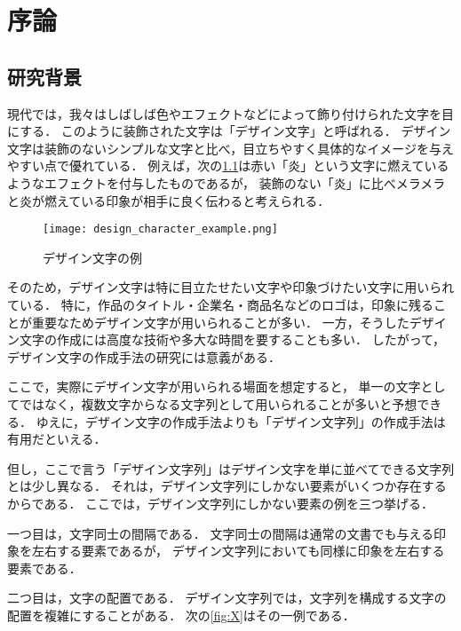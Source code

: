 \documentclass[\homedir/main.tex]{subfiles}
\begin{document}
\setcounter{chapter}{0}
\chapter{序論}\label{chap:introduction}

\section{研究背景}\label{sec:background}
現代では，我々はしばしば色やエフェクトなどによって飾り付けられた文字を目にする．
このように装飾された文字は「デザイン文字」と呼ばれる．
デザイン文字は装飾のないシンプルな文字と比べ，目立ちやすく具体的なイメージを与えやすい点で優れている．
例えば，次の\cref{fig:design_char_eg}は赤い「炎」という文字に燃えているようなエフェクトを付与したものであるが，
装飾のない「炎」に比べメラメラと炎が燃えている印象が相手に良く伝わると考えられる．

\begin{figure}[h]
    \centering
    \texttt{[image: design\_character\_example.png]}
    \caption{デザイン文字の例}
    \label{fig:design_char_eg}
\end{figure}

そのため，デザイン文字は特に目立たせたい文字や印象づけたい文字に用いられている．
特に，作品のタイトル・企業名・商品名などのロゴは，印象に残ることが重要なためデザイン文字が用いられることが多い．
一方，そうしたデザイン文字の作成には高度な技術や多大な時間を要することも多い．
したがって，デザイン文字の作成手法の研究には意義がある．

ここで，実際にデザイン文字が用いられる場面を想定すると，
単一の文字としてではなく，複数文字からなる文字列として用いられることが多いと予想できる．
ゆえに，デザイン文字の作成手法よりも「デザイン文字列」の作成手法は有用だといえる．

但し，ここで言う「デザイン文字列」はデザイン文字を単に並べてできる文字列とは少し異なる．
それは，デザイン文字列にしかない要素がいくつか存在するからである．
ここでは，デザイン文字列にしかない要素の例を三つ挙げる．

一つ目は，文字同士の間隔である．
文字同士の間隔は通常の文書でも与える印象を左右する要素であるが，
デザイン文字列においても同様に印象を左右する要素である．

二つ目は，文字の配置である．
デザイン文字列では，文字列を構成する文字の配置を複雑にすることがある．
次の\cref{fig:X}はその一例である．
\end{document}
